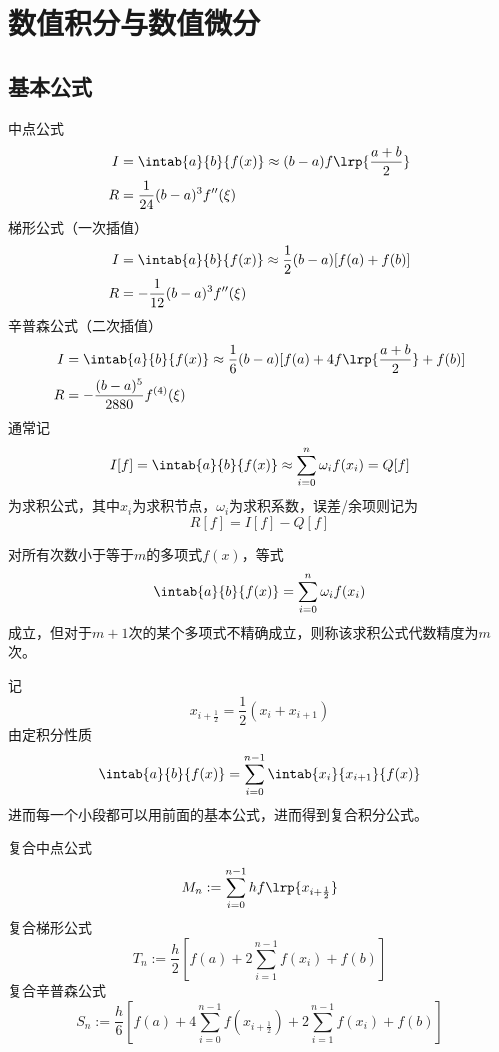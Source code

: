 
\section{数值积分与数值微分}
\subsection{基本公式}
中点公式
\[\begin{aligned}
    I&=\intab{a}{b}{f(x)}\approx(b-a)f\lrp{\frac{a+b}{2}}\\
    R&=\frac{1}{24}(b-a)^3f''(\xi)
\end{aligned}\]
梯形公式（一次插值）
\[\begin{aligned}
    I&=\intab{a}{b}{f(x)}\approx\frac{1}{2}(b-a)[f(a)+f(b)]\\
    R&=-\frac{1}{12}(b-a)^3f''(\xi)
\end{aligned}\]
辛普森公式（二次插值）
\[\begin{aligned}
    I&=\intab{a}{b}{f(x)}\approx\frac{1}{6}(b-a)[f(a)+4f\lrp{\frac{a+b}{2}}+f(b)]\\
    R&=-\frac{(b-a)^5}{2880}f^{(4)}(\xi)
\end{aligned}\]
通常记
\[I[f]=\intab{a}{b}{f(x)}\approx\sum_{i=0}^n\omega_i f(x_i)=Q[f]\]
为求积公式，其中$x_i$为求积节点，$\omega_i$为求积系数，误差/余项则记为
\[R[f]=I[f]-Q[f]\]
\begin{definition}[代数精度]
    对所有次数小于等于$m$的多项式$f(x)$，等式
    \[\intab{a}{b}{f(x)}=\sum_{i=0}^n\omega_i f(x_i)\]
    成立，但对于$m+1$次的某个多项式不精确成立，则称该求积公式代数精度为$m$次。
\end{definition}

记
\[x_{i+\frac{1}{2}}=\frac{1}{2}(x_i+x_{i+1})\]
由定积分性质
\[\intab{a}{b}{f(x)}=\sum_{i=0}^{n-1}\intab{x_i}{x_{i+1}}{f(x)}\]
进而每一个小段都可以用前面的基本公式，进而得到复合积分公式。

复合中点公式
\[M_n:=\sum_{i=0}^{n-1}hf\lrp{x_{i+\frac{1}{2}}}\]
复合梯形公式
\[T_n:=\frac{h}{2}[f(a)+2\sum_{i=1}^{n-1}f(x_i)+f(b)]\]
复合辛普森公式
\[S_n:=\frac{h}{6}[f(a)+4\sum_{i=0}^{n-1}f(x_{i+\frac{1}{2}})+2\sum_{i=1}^{n-1}f(x_i)+f(b)]\]

